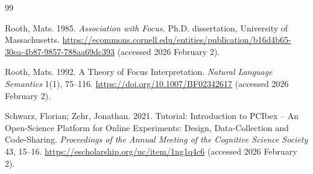 \documentclass[a4paper, ruler]{CUP-JNL-LIN}%
\begin{document}
\begin{Backmatter}
\begin{thebibliography}{99}

{Rooth, Mats}. 1985. \textit{Association with Focus.} Ph.D. dissertation, University of Massachusetts. \url{https://ecommons.cornell.edu/entities/publication/b16d4b65-30ea-4b87-9857-788aa69dc393} (accessed 2026 February 2).




{Rooth, Mats}. 1992. A Theory of Focus Interpretation. \textit{Natural Language Semantics} 1(1), 75--116. \url{https://doi.org/10.1007/BF02342617} (accessed 2026 February 2).




{Schwarz, Florian; Zehr, Jonathan}. 2021. Tutorial: Introduction to PCIbex – An Open-Science Platform for Online Experiments: Design, Data-Collection and Code-Sharing. \textit{Proceedings of the Annual Meeting of the Cognitive Science Society} 43, 15–16. \url{https://escholarship.org/uc/item/1ng1q4c6} (accessed 2026 February 2).



\end{thebibliography}
\end{Backmatter}
\end{document}
